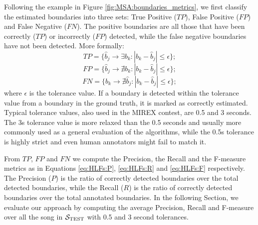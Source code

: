 Following the example in Figure \ref{fig:MSA:boundaries_metrics}, we first classify the estimated boundaries into three sets: True Positive ($TP$), False Positive ($FP$) and False Negative ($FN$). The positive boundaries are all those that have been correctly ($TP$) or incorrectly ($FP$) detected, while the false negative boundaries have not been detected. More formally:
\begin{equation}
TP=\{ \hat{b}_j \rightarrow \exists b_k: |b_k-\hat{b}_j|\leq \epsilon \};
\end{equation}
\begin{equation}
FP=\{ \hat{b}_j \rightarrow \nexists b_k: |b_k-\hat{b}_j|\leq \epsilon \};
\end{equation}
\begin{equation}
FN=\{ b_k  \rightarrow \nexists \hat{b}_j: |b_k-\hat{b}_j|\leq \epsilon \};
\end{equation}
where $\epsilon$ is the tolerance value. If a boundary is detected within the tolerance value from a boundary in the ground truth, it is marked as correctly estimated. Typical tolerance values, also used in the MIREX contest, are 0.5 and 3 seconds. The 3s tolerance value is more relaxed than the 0.5 seconds and usually more commonly used as a general evaluation of the algorithms, while the 0.5s tolerance is highly strict and even human annotators might fail to match it.

From $TP$, $FP$ and $FN$ we compute the Precision, the Recall and the F-measure metrics as in Equations \ref{eq:HLFs:P}, \ref{eq:HLFs:R} and \ref{eq:HLFs:F} respectively. The Precision ($P$) is the ratio of correctly detected boundaries over the total detected boundaries, while the Recall ($R$) is the ratio of correctly detected boundaries over the total annotated boundaries. In the following Section, we evaluate our approach by computing the average Precision, Recall and F-measure over all the song in $\mathcal{S}_\text{TEST}$ with 0.5 and 3 second tolerances.

